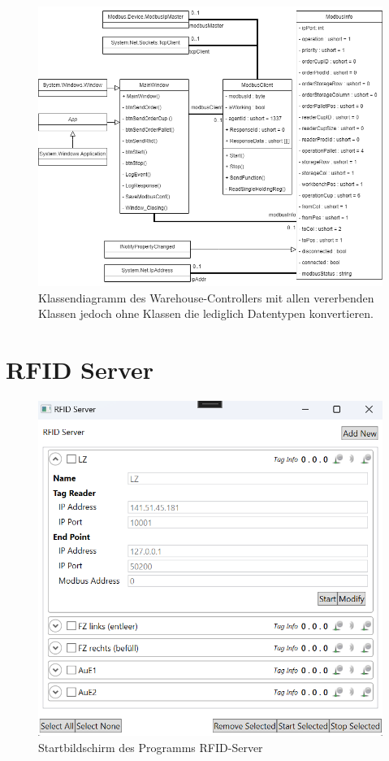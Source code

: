 \begin{figure}
    \caption[Klassendiagramm des Controllers ]
    {\small Klassendiagramm des Warehouse-Controllers mit allen vererbenden Klassen jedoch ohne Klassen die
    lediglich Datentypen konvertieren.}\label{fig:figure6}
    \includegraphics[width = \textwidth ]{Bilder/C_Klassendiagramm}
    \centering
\end{figure}

\newpage
\section {RFID Server}
\begin{figure}
    \caption[Startbildschirm des Programms RFID-Server]
    {\small Startbildschirm des Programms RFID-Server}\label{fig:figure7}
    \includegraphics[height = \textwidth ]{Bilder/RFIDServer_Bildschirm}
    \centering
\end{figure}

